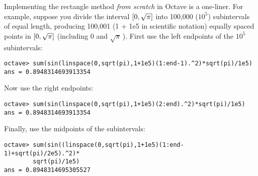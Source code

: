 Implementing the rectangle method \emph{from scratch} in Octave is a one-liner.
For example, suppose you divide the interval $\lbrack 0,\sqrt{\pi} \rbrack$ into 100,000
($10^5$) subintervals of equal length, producing 100,001 (1 + 1e5 in scientific
notation) equally spaced points in $\lbrack 0,\sqrt{\pi} \rbrack$ (including $0$ and
$\sqrt{\pi}\,$). First use the left endpoints of the $10^5$ subintervals:
\begin{Verbatim}[frame=single, framesep=2mm]
octave> sum(sin(linspace(0,sqrt(pi),1+1e5)(1:end-1).^2)*sqrt(pi)/1e5)
ans = 0.8948314693913354
\end{Verbatim}
\noindent Now use the right endpoints:
\begin{Verbatim}[frame=single, framesep=2mm]
octave> sum(sin(linspace(0,sqrt(pi),1+1e5)(2:end).^2)*sqrt(pi)/1e5)
ans = 0.8948314693913354
\end{Verbatim}
\noindent Finally, use the midpoints of the subintervals:
\begin{Verbatim}[frame=single, framesep=2mm]
octave> sum(sin((linspace(0,sqrt(pi),1+1e5)(1:end-1)+sqrt(pi)/2e5).^2)*
        sqrt(pi)/1e5)
ans = 0.8948314695305527
\end{Verbatim}

